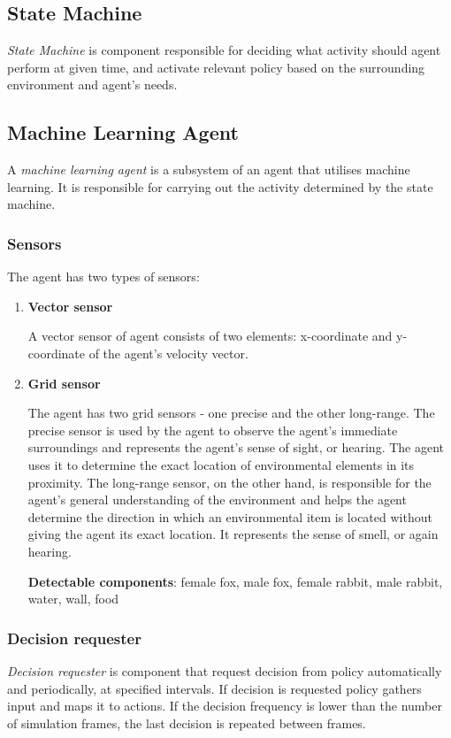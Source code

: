 \subsection{State Machine}
\emph{State Machine} is component responsible for deciding what activity should agent perform at given time, and activate relevant policy based on the surrounding environment and agent's needs.

\subsection{Machine Learning Agent}
A \emph{machine learning agent} is a subsystem of an agent that utilises machine learning. It is responsible for carrying out the activity determined by the state machine.

\subsubsection{Sensors}
The agent has two types of sensors:
\begin{enumerate}
    \item \textbf{Vector sensor}
    
    A vector sensor of agent consists of two elements: x-coordinate and y-coordinate of the agent's velocity vector.
    
    \item \textbf{Grid sensor}
    
    The agent has two grid sensors - one precise and the other long-range. The precise sensor is used by the agent to observe the agent's immediate surroundings and represents the agent's sense of sight, or hearing. The agent uses it to determine the exact location of environmental elements in its proximity. The long-range sensor, on the other hand, is responsible for the agent's general understanding of the environment and helps the agent determine the direction in which an environmental item is located without giving the agent its exact location. It represents the sense of smell, or again hearing.
     
    \textbf{Detectable components}: female fox, male fox, female rabbit, male rabbit, water, wall, food
     
\end{enumerate}

\subsubsection{Decision requester}
\emph{Decision requester} is component that request decision from policy automatically and periodically, at specified intervals. If decision is requested policy gathers input and maps it to actions. If the decision frequency is lower than the number of simulation frames, the last decision is repeated between frames.

